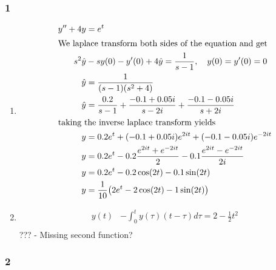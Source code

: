 \documentclass[a4paper]{article}
\newcommand{\ex}[1]{\subsubsection*{#1}}
\begin{document}
\pagestyle{fancy} %


\ex{1}

\begin{enumerate}[label=\alph*)]
    \item
        \begin{align}
            y'' + 4y &= e^t \\
            \intertext{We laplace transform both sides of the equation and get}
            s^2\hat y &- sy(0) - y'(0) + 4 \hat y = \frac{1}{s-1}, \quad y(0) = y'(0) = 0\\
            \hat y &= \frac{1}{(s-1)(s^2 + 4)}\\
            \hat y &= \frac{0.2}{s-1} + \frac{-0.1 + 0.05i}{s-2i} + \frac{-0.1
                - 0.05i}{s+2i} \\
            \intertext{taking the inverse laplace transform yields}
            y &= 0.2e^t + ( -0.1 + 0.05i)e^{2it} + ( -0.1 - 0.05i)e^{-2it} \\
            y &= 0.2e^t -0.2\frac{e^{2it}+e^{-2it}}{2} - 0.1\frac{e^{2it} -
                e^{-2it}}{2i} \\
            y &= 0.2e^t - 0.2\cos(2t) - 0.1\sin(2t) \\
            y &= \frac{1}{10}\big(2e^t - 2\cos(2t) - 1\sin(2t)\big) \\
        \end{align}

    \item
        \begin{align}
            y(t) &- \int_0^t{y(\tau)(t-\tau) d\tau} = 2 - \frac{1}{2}t^2 \\
        \end{align}
        ??? - Missing second function?
\end{enumerate}

\ex{2}
\end{document}
